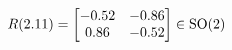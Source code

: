 \documentclass[preview]{standalone}
\begin{document}
\begin{align*}
\special{dvisvgm:raw <g id='unique000'>}R(2.11) = \begin{bmatrix} -0.52 & -0.86 \\ 0.86 & -0.52 \end{bmatrix} \in \text{SO}(2)\special{dvisvgm:raw </g>}
\end{align*}
\end{document}
